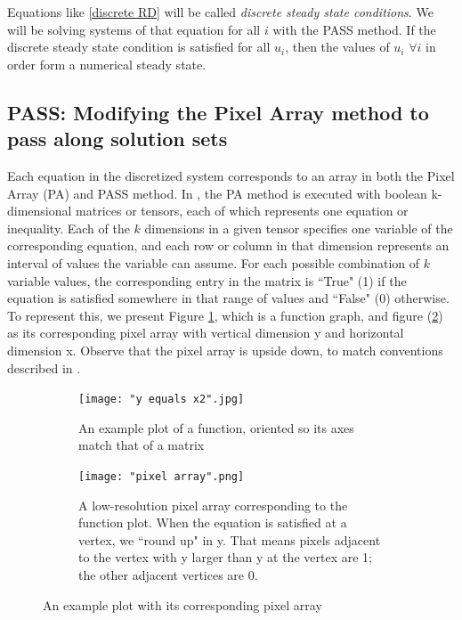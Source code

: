 \documentclass[11pt]{article}
\begin{document}
Equations like \eqref{discrete RD} will be called \textit{discrete steady state conditions}. We will be solving systems of that equation for all $i$ with the PASS method. If the discrete steady state condition is satisfied for all $u_i$, then the values of $u_i$ $\forall i$ in order form a numerical steady state.

\subsection{PASS: Modifying the Pixel Array method to pass along solution sets}\label{sec:PASS}

Each equation in the discretized system corresponds to an array in both the Pixel Array (PA) and PASS method. In \citep{Introduction_to_PA}, the PA method is executed with boolean k-dimensional matrices or tensors, each of which represents one equation or inequality. Each of the $k$ dimensions in a given tensor specifies one variable of the corresponding equation, and each row or column in that dimension represents an interval of values the variable can assume. For each possible combination of $k$ variable values, the corresponding entry in the matrix is ``True" (1) if the equation is satisfied somewhere in that range of values and ``False" (0) otherwise. To represent this, we present Figure \cref{sample_function}, which is a function graph, and figure (\cref{sample_pixel_array}) as its corresponding pixel array with vertical dimension y and horizontal dimension x. Observe that the pixel array is upside down, to match conventions described in \citep{Introduction_to_PA}.

\begin{figure}[h]
\begin{subfigure}{.4\textwidth}
  \centering
  \captionsetup{width=0.8\textwidth}
  \texttt{[image: "y equals x2".jpg]}
  \caption{An example plot of a function, oriented so its axes match that of a matrix\\\vspace{.6in}}
  \label{sample_function}
\end{subfigure}%
\begin{subfigure}{.4\textwidth}
  \centering
  \captionsetup{width=0.84\textwidth}
  \texttt{[image: "pixel array".png]}
  \caption{A low-resolution pixel array corresponding to the function plot. When the equation is satisfied at a vertex, we ``round up" in y. That means pixels adjacent to the vertex with y larger than y at the vertex are 1; the other adjacent vertices are 0.}
  \label{sample_pixel_array}
\end{subfigure}%
\caption{An example plot with its corresponding pixel array}
\label{plot_and_pa}
\end{figure}
\end{document}
